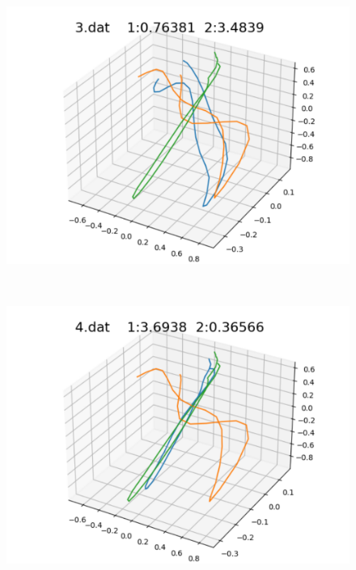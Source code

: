 \begin{figure}[h]
\begin{minipage}[b]{0.32\linewidth}
  \includegraphics[keepaspectratio, scale=0.3]
  {./pic/level2/3_dat.pdf}
  \label{3dat}
 \end{minipage}\\
 \begin{minipage}[b]{0.32\linewidth}
  \centering
  \includegraphics[keepaspectratio, scale=0.3]
  {./pic/level2/4_dat.pdf}
  \label{4dat}
 \end{minipage}
 \begin{minipage}[b]{0.32\linewidth}
  \centering

\end{minipage}
\end{figure}
